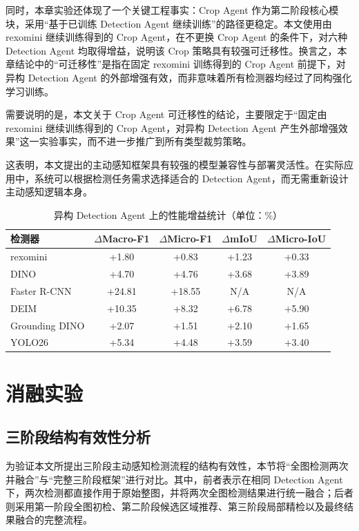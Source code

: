 同时，本章实验还体现了一个关键工程事实：Crop Agent 作为第二阶段核心模块，采用“基于已训练 Detection Agent 继续训练”的路径更稳定。本文使用由 rexomini 继续训练得到的 Crop Agent，在不更换 Crop Agent 的条件下，对六种 Detection Agent 均取得增益，说明该 Crop 策略具有较强可迁移性。换言之，本章结论中的“可迁移性”是指在固定 rexomini 训练得到的 Crop Agent 前提下，对异构 Detection Agent 的外部增强有效，而非意味着所有检测器均经过了同构强化学习训练。

需要说明的是，本文关于 Crop Agent 可迁移性的结论，主要限定于“固定由 rexomini 继续训练得到的 Crop Agent，对异构 Detection Agent 产生外部增强效果”这一实验事实，而不进一步推广到所有类型裁剪策略。

这表明，本文提出的主动感知框架具有较强的模型兼容性与部署灵活性。在实际应用中，系统可以根据检测任务需求选择适合的 Detection Agent，而无需重新设计主动感知逻辑本身。

\begin{table}[htbp]
    \centering
    \caption{异构 Detection Agent 上的性能增益统计（单位：\%）}
    \label{tab:heterogeneous_gain}
    \begin{tabular}{lcccc}
        \toprule
        检测器 & $\Delta$Macro-F1 & $\Delta$Micro-F1 & $\Delta$mIoU & $\Delta$Micro-IoU \\
        \midrule
        rexomini & +1.80 & +0.83 & +1.23 & +0.33 \\
        DINO & +4.70 & +4.76 & +3.68 & +3.89 \\
        Faster R-CNN & +24.81 & +18.55 & N/A & N/A \\
        DEIM & +10.35 & +8.32 & +6.78 & +5.90 \\
        Grounding DINO & +2.07 & +1.51 & +2.10 & +1.65 \\
        YOLO26 & +5.34 & +4.48 & +3.59 & +3.40 \\
        \bottomrule
    \end{tabular}
\end{table}


\section{消融实验}
\label{sec:ablation_study}

\subsection{三阶段结构有效性分析}
\label{subsec:ablation_three_stage}

为验证本文所提出三阶段主动感知检测流程的结构有效性，本节将“全图检测两次并融合”与“完整三阶段框架”进行对比。其中，前者表示在相同 Detection Agent 下，两次检测都直接作用于原始整图，并将两次全图检测结果进行统一融合；后者则采用第一阶段全图初检、第二阶段候选区域推荐、第三阶段局部精检以及最终结果融合的完整流程。

